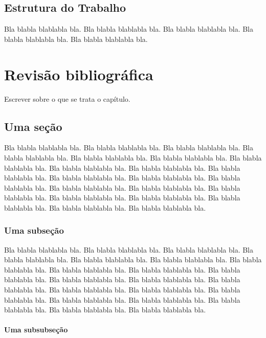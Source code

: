 \documentclass[diss,capa,times,english]{ppgci}
\begin{document}
\section{Estrutura do Trabalho} 

Bla blabla blablabla bla.  Bla blabla blablabla bla.  Bla blabla
blablabla bla.  Bla blabla blablabla bla.  Bla blabla blablabla bla.

\chapter{Revisão bibliográfica} %

Escrever sobre o que se trata o capítulo.

\section{Uma seção}

Bla blabla blablabla bla.  Bla blabla blablabla bla.  Bla blabla
blablabla bla.  Bla blabla blablabla bla.  Bla blabla blablabla bla.
Bla blabla blablabla bla.  Bla blabla blablabla bla.  Bla blabla
blablabla bla.  Bla blabla blablabla bla.  Bla blabla blablabla bla.
Bla blabla blablabla bla.  Bla blabla blablabla bla.  Bla blabla
blablabla bla.  Bla blabla blablabla bla.  Bla blabla blablabla bla.
Bla blabla blablabla bla.  Bla blabla blablabla bla.  Bla blabla
blablabla bla.  Bla blabla blablabla bla.  Bla blabla blablabla bla.
Bla blabla blablabla bla.

\subsection{Uma subseção}

Bla blabla blablabla bla.  Bla blabla blablabla bla.  Bla blabla
blablabla bla.  Bla blabla blablabla bla.  Bla blabla blablabla bla.
Bla blabla blablabla bla.  Bla blabla blablabla bla.  Bla blabla
blablabla bla.  Bla blabla blablabla bla.  Bla blabla blablabla bla.
Bla blabla blablabla bla.  Bla blabla blablabla bla.  Bla blabla
blablabla bla.  Bla blabla blablabla bla.  Bla blabla blablabla bla.
Bla blabla blablabla bla.  Bla blabla blablabla bla.  Bla blabla
blablabla bla.  Bla blabla blablabla bla.  Bla blabla blablabla bla.
Bla blabla blablabla bla.

\subsubsection{Uma subsubseção}
\end{document}
